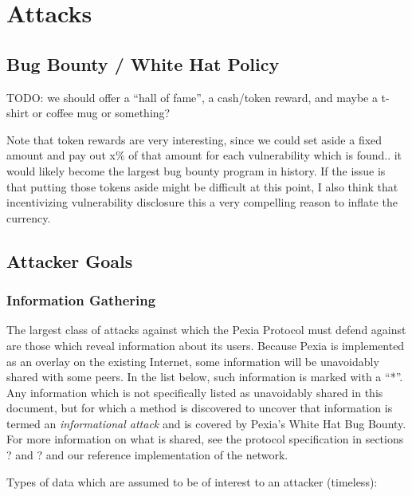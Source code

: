 \documentclass{article}
\newcommand{\mesh}{Pexia}
\begin{document}
\section{Attacks}
\label{sec:attacks}

\subsection{Bug Bounty / White Hat Policy}

TODO: we should offer a “hall of fame”, a cash/token reward, and maybe a t-shirt or coffee mug or something?

Note that token rewards are very interesting, since we could set aside a fixed amount and pay out x\% of that amount for each vulnerability which is found.. it would likely become the largest bug bounty program in history. If the issue is that putting those tokens aside might be difficult at this point, I also think that incentivizing vulnerability disclosure this a very compelling reason to inflate the currency.

\subsection{Attacker Goals}

\subsubsection{Information Gathering}

The largest class of attacks against which the \mesh{} Protocol must defend against are those which reveal information about its users. Because \mesh{} is implemented as an overlay on the existing Internet, some information will be unavoidably shared with some peers. In the list below, such information is marked with a “*”. Any information which is not specifically listed as unavoidably shared in this document, but for which a method is discovered to uncover that information is termed an \emph{informational attack} and is covered by \mesh{}’s White Hat Bug Bounty. For more information on what is shared, see the protocol specification in sections ? and ? and our reference implementation of the network.

Types of data which are assumed to be of interest to an attacker (timeless):
\end{document}
